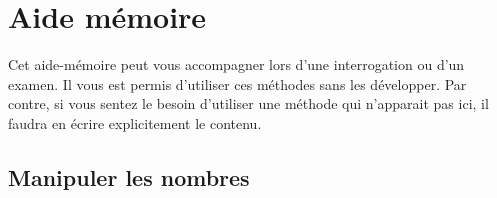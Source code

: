 \chapter{Aide mémoire}

	Cet aide-mémoire peut vous accompagner lors d'une
	interrogation ou d'un examen. 
	Il vous est permis d’utiliser ces méthodes sans les développer.
	Par contre, si vous sentez le besoin d’utiliser 
	une méthode qui n'apparait pas ici, 
	il faudra en écrire explicitement le contenu.

\section*{Manipuler les nombres}

	\begin{algo}
	\end{algo}
	
	
	
	
